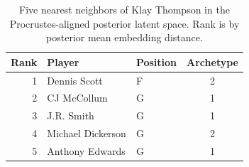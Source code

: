 \begin{table}[htbp]
  \centering\small
  \begin{tabular}{rllc}
    \toprule
    Rank & Player & Position & Archetype \\
    \midrule
    1 & Dennis Scott & F & 2 \\
    2 & CJ McCollum & G & 1 \\
    3 & J.R. Smith & G & 1 \\
    4 & Michael Dickerson & G & 2 \\
    5 & Anthony Edwards & G & 1 \\
    \bottomrule
  \end{tabular}
  \caption{Five nearest neighbors of Klay Thompson in the Procrustes-aligned posterior latent space. Rank is by posterior mean embedding distance.}
  \label{tab:Klay_Thompson_neighbors}
\end{table}

